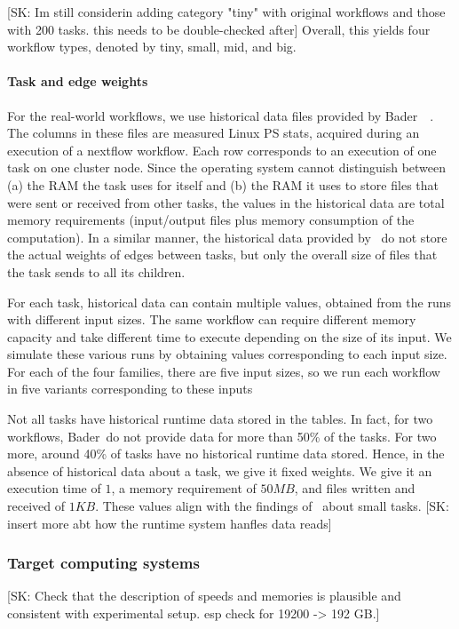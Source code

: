 \documentclass[conference]{IEEEtran}
\newcommand{\skug}[1]{{\color{blue}[SK: #1]}}
\begin{document}
    \skug{Im still considerin adding category "tiny" with original workflows and those with 200 tasks. this needs to be double-checked after}
    Overall, this yields four workflow types, denoted by tiny, small, mid, and big.

    \paragraph{Task and edge weights}
    For the real-world workflows, we use historical data files provided by Bader~\etal~\cite{lotaru}.
    The columns in these files are measured Linux PS stats, acquired during an execution of a nextflow workflow.
    Each row corresponds to an execution of one task on one cluster node.
    Since the operating system cannot distinguish between (a) the RAM the task uses for itself and (b) the RAM it uses
    to store files that were sent or received from other tasks, the values in the historical data are total memory requirements (input/output files plus memory consumption of the computation).
    In a similar manner, the historical data provided by~\cite{lotaru} do not store the actual weights of edges between tasks, but only the overall
    size of files that the task sends to all its children.

    For each task, historical data can contain multiple values, obtained from the runs with different input sizes.
    The same workflow can require different memory capacity and take different time to execute
    depending on the size of its input.
    We simulate these various runs by obtaining values corresponding to each input size.
    For each of the four families, there are five input sizes, so we run each workflow in five variants corresponding to these inputs

    Not all tasks have historical runtime data stored in the tables.
    In fact, for two workflows, Bader~\etal do not provide data for more than 50\% of the tasks.
    For two more, around 40\% of tasks have no historical runtime data stored.
    Hence, in the absence of historical data about a task, we give it fixed weights.
    We give it an execution time of $1$, a memory requirement of $50 MB$, and files written and received of $1KB$.
    These values align with the findings of~\cite{lotaru} about small tasks.
%
    \skug{insert more abt how the runtime system hanfles data reads}

    \subsubsection{Target computing systems}
    \skug{Check that the description of speeds and memories is plausible and consistent with experimental setup. esp check for 19200 -> 192 GB.}
\end{document}
